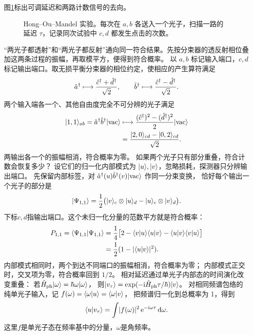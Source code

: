 图\ref{fig:hom-ports}标出可调延迟和两路计数信号的去向。
\begin{figure}[htbp]
    \centering{}
    \caption{Hong--Ou--Mandel 实验。每次在 $a,b$ 各送入一个光子，扫描一路的延迟 $\tau$，记录同次试验中 $c,d$ 都发生点击的次数。}
    \label{fig:hom-ports}
\end{figure}

“两光子都透射”和“两光子都反射”通向同一符合结果。先按分束器的透反射相位叠加这两条过程的振幅，再取模平方，便得到符合概率。
以 $a,b$ 标记输入端口，$c,d$ 标记输出端口。取无损平衡分束器的相位约定，使相应的产生算符满足
\begin{equation}
    \hat{a}^\dagger \longmapsto \frac{\hat{c}^\dagger + \hat{d}^\dagger}{\sqrt2},\qquad
    \hat{b}^\dagger \longmapsto \frac{\hat{c}^\dagger - \hat{d}^\dagger}{\sqrt2}.
\end{equation}
两个输入端各一个、其他自由度完全不可分辨的光子满足
\begin{equation}
    \begin{alignedat}{1}
        \lvert1,1\rangle_{ab} = \hat{a}^\dagger \hat{b}^\dagger\lvert\mathrm{vac}\rangle &\longmapsto \frac{(\hat{c}^\dagger)^2 - (\hat{d}^\dagger)^2}{2}\lvert\mathrm{vac}\rangle\\
        &= \frac{\lvert2,0\rangle_{cd} - \lvert0,2\rangle_{cd}}{\sqrt2}.
    \end{alignedat}
\end{equation}
两输出各一个的振幅相消，符合概率为零。
如果两个光子只有部分重叠，符合计数会恢复多少？
设它们的归一化内部模式为 $\lvert u\rangle,\lvert v\rangle$，忽略损耗，探测器只分辨输出端口。
先保留内部标签，对 $\hat{a}^\dagger(u)\hat{b}^\dagger(v)\lvert\mathrm{vac}\rangle$ 作同一分束变换，
恰好每个输出一个光子的部分是
\begin{equation}
    \lvert\Psi_{1,1}\rangle
    = \frac12\bigl(\lvert v\rangle_c \otimes \lvert u\rangle_d - \lvert u\rangle_c \otimes \lvert v\rangle_d\bigr).
\end{equation}
下标$c,d$指输出端口。这个未归一化分量的范数平方就是符合概率：
\begin{equation}
    \begin{alignedat}{1}
        P_{1,1} = \langle\Psi_{1,1}\vert\Psi_{1,1}\rangle &= \frac14\bigl[2 - \langle v\vert u\rangle\langle u\vert v\rangle - \langle u\vert v\rangle\langle v\vert u\rangle\bigr]\\
        &= \frac12(1 - \lvert\langle u\vert v\rangle\rvert^2).
    \end{alignedat}
\end{equation}
内部模式相同时，两个到达不同端口的振幅相消，符合概率为零；
内部模式正交时，交叉项为零，符合概率回到 $1/2$。
相对延迟通过单光子内部态的时间演化改变重叠：
若$\hat{H}_\mathrm{ph}\lvert\omega\rangle = \hbar\omega\lvert\omega\rangle$，
则$\lvert v_\tau\rangle = \exp(-\mathrm{i} \hat{H}_\mathrm{ph}\tau/\hbar)\lvert v\rangle$。
对相同频谱包络的纯单光子输入，记
$f(\omega) = \langle\omega\vert u\rangle = \langle\omega\vert v\rangle$，
把频谱归一化到总概率为 1，得到
\begin{equation}
    \langle u\vert v_\tau\rangle
    = \int \lvert f(\omega)\rvert^2\mathop{}\!\mathrm{e}^{-\mathrm{i}\omega\tau}\mathop{}\!\mathrm{d}\omega.
\end{equation}
这里$f$是单光子态在频率基中的分量，$\omega$是角频率。

